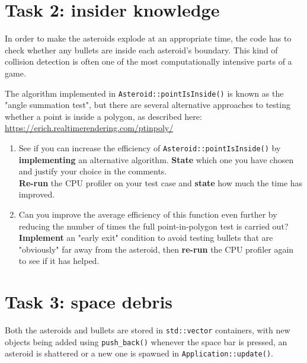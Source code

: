 \documentclass{../../../fal_assignment}
\begin{document}
\section*{Task 2: insider knowledge}

In order to make the asteroids explode at an appropriate time, the code has to check whether any bullets are inside each asteroid's boundary. This kind of collision detection is often one of the most computationally intensive parts of a game.

The algorithm implemented in \lstinline{Asteroid::pointIsInside()} is known as the "angle summation test", but there are several alternative approaches to testing whether a point is inside a polygon, as described here: \url{https://erich.realtimerendering.com/ptinpoly/}

\begin{enumerate}
	\item See if you can increase the efficiency of \lstinline{Asteroid::pointIsInside()} by \textbf{implementing} an alternative algorithm. \textbf{State} which one you have chosen and justify your choice in the comments.\\
\textbf{Re-run} the CPU profiler on your test case and \textbf{state} how much the time has improved.\\
	\item Can you improve the average efficiency of this function even further by reducing the number of times the full point-in-polygon test is carried out?\\
\textbf{Implement} an "early exit" condition to avoid testing bullets that are "obviously" far away from the asteroid, then \textbf{re-run} the CPU profiler again to see if it has helped.
\end{enumerate}

\section*{Task 3: space debris}

Both the asteroids and bullets are stored in \lstinline{std::vector} containers, with new objects being added using \lstinline{push_back()} whenever the space bar is pressed, an asteroid is shattered or a new one is spawned in \lstinline{Application::update()}.
\end{document}
